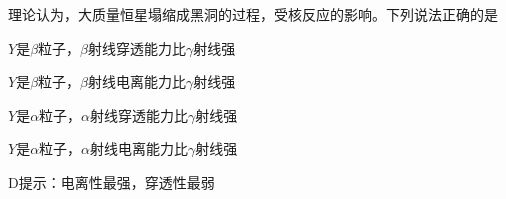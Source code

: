 理论认为，大质量恒星塌缩成黑洞的过程，受核反应的影响。下列说法正确的是\paren[D]
\begin{choices}
	\item \(Y\)是\(\beta\)粒子，\(\beta\)射线穿透能力比\(\gamma\)射线强
	\item \(Y\)是\(\beta\)粒子，\(\beta\)射线电离能力比\(\gamma\)射线强
	\item \(Y\)是\(\alpha\)粒子，\(\alpha\)射线穿透能力比\(\gamma\)射线强
	\item \(Y\)是\(\alpha\)粒子，\(\alpha\)射线电离能力比\(\gamma\)射线强
\end{choices}
\begin{answer}
	D\qquad 提示：电离性最强，穿透性最弱
\end{answer}